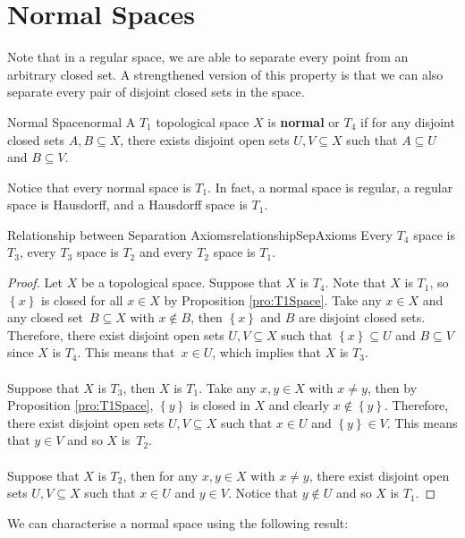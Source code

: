 \documentclass[math]{amznotes}
\theoremstyle{remark}
\begin{document}
\section{Normal Spaces}
Note that in a regular space, we are able to separate every point from an arbitrary closed set. A strengthened version of this property is that we can also separate every pair of disjoint closed sets in the space. 
\begin{dfnbox}{Normal Space}{normal}
    A $T_1$ topological space $X$ is {\color{red} \textbf{normal}} or {\color{red} \textbf{$T_4$}} if for any disjoint closed sets $A, B \subseteq X$, there exists disjoint open sets $U, V \subseteq X$ such that $A \subseteq U$ and $B \subseteq V$.
\end{dfnbox}
Notice that every normal space is $T_1$. In fact, a normal space is regular, a regular space is Hausdorff, and a Hausdorff space is $T_1$. 
\begin{probox}{Relationship between Separation Axioms}{relationshipSepAxioms}
    Every $T_4$ space is $T_3$, every $T_3$ space is $T_2$ and every $T_2$ space is $T_1$.
    \tcblower
    \begin{proof}
        Let $X$ be a topological space. Suppose that $X$ is $T_4$. Note that $X$ is $T_1$, so~$\left\{x\right\}$ is closed for all $x \in X$ by Proposition \ref{pro:T1Space}. Take any $x \in X$ and any closed set~$B \subseteq X$ with $x \notin B$, then $\left\{x\right\}$ and $B$ are disjoint closed sets. Therefore, there exist disjoint open sets $U, V \subseteq X$ such that $\left\{x\right\} \subseteq U$ and $B \subseteq V$ since $X$ is $T_4$. This means that~$x \in U$, which implies that $X$ is $T_3$.
        \\\\
        Suppose that $X$ is $T_3$, then $X$ is $T_1$. Take any $x, y \in X$ with $x \neq y$, then by Proposition \ref{pro:T1Space}, $\left\{y\right\}$ is closed in $X$ and clearly $x \notin \left\{y\right\}$. Therefore, there exist disjoint open sets $U, V \subseteq X$ such that $x \in U$ and $\left\{y\right\} \in V$. This means that $y \in V$ and so $X$ is~$T_2$.
        \\\\
        Suppose that $X$ is $T_2$, then for any $x, y \in X$ with $x \neq y$, there exist disjoint open sets $U, V \subseteq X$ such that $x \in U$ and $y \in V$. Notice that $y \notin U$ and so $X$ is $T_1$.
    \end{proof}
\end{probox}
We can characterise a normal space using the following result:
\end{document}
